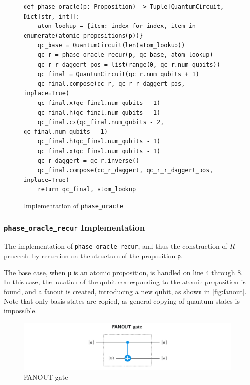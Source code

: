 \begin{figure}[H]
\centering
\begin{verbatim}
def phase_oracle(p: Proposition) -> Tuple[QuantumCircuit, Dict[str, int]]:
    atom_lookup = {item: index for index, item in enumerate(atomic_propositions(p))}
    qc_base = QuantumCircuit(len(atom_lookup))
    qc_r = phase_oracle_recur(p, qc_base, atom_lookup)
    qc_r_r_daggert_pos = list(range(0, qc_r.num_qubits))
    qc_final = QuantumCircuit(qc_r.num_qubits + 1)
    qc_final.compose(qc_r, qc_r_r_daggert_pos, inplace=True)
    qc_final.x(qc_final.num_qubits - 1)
    qc_final.h(qc_final.num_qubits - 1)
    qc_final.cx(qc_final.num_qubits - 2, qc_final.num_qubits - 1)
    qc_final.h(qc_final.num_qubits - 1)
    qc_final.x(qc_final.num_qubits - 1)
    qc_r_daggert = qc_r.inverse()
    qc_final.compose(qc_r_daggert, qc_r_r_daggert_pos, inplace=True)
    return qc_final, atom_lookup
\end{verbatim}
\caption{Implementation of \texttt{phase_oracle} }
\label{fig:phase_oracle}
\end{figure}

\subsubsection{\texttt{phase\_oracle\_recur} Implementation}\label{subsubsec:phase-oracle-recur-implementation}

The implementation of \texttt{phase\_oracle\_recur}, and thus the construction of $R$ proceeds by recursion on the structure of the proposition \texttt{p}.

The base case, when \texttt{p} is an atomic proposition, is handled on line 4 through 8.
In this case, the location of the qubit corresponding to the atomic proposition is found, and a fanout is created, introducing a new qubit, as shown in \autoref{fig:fanout}.
Note that only basis states are copied, as general copying of quantum states is impossible.

\begin{figure}[H]
    \centering
    \includegraphics[width=\textwidth]{figures/FANOUT-with-CNOT.jpg}
    \caption{FANOUT gate}
    \label{fig:fanout}
\end{figure}

